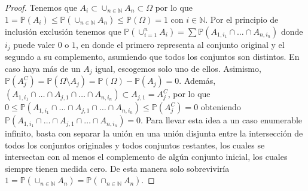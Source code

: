 \documentclass{article}
\theoremstyle{definition}
\theoremstyle{remark}
\newcommand{\BN}{\mathbb N}
\begin{document}
\begin{proof}
  Tenemos que $A_i \subset \cup_{n \in \BN} A_n \subset \Omega$ por lo que $1 = \mathbb{P}(A_i) \leq \mathbb{P}(\cup_{n \in \BN} A_n) \leq \mathbb{P}(\Omega) = 1$ con $i \in \BN$.
  Por el principio de inclusi\'on exclusi\'on tenemos que $\mathbb{P}(\cup_{i = 1}^n A_i) = \sum \mathbb{P}(A_{1, i_1} \cap \dots \cap A_{n, i_n})$
  donde $i_j$ puede valer $0$ o $1$, en donde el primero representa al conjunto original y el segundo a su complemento, asumiendo que todos los conjuntos son distintos.
  En caso haya m\'as de un $A_j$ igual, escogemos solo uno de ellos.
  Asimismo, $\mathbb{P}(A_j^C) = \mathbb{P}(\Omega \setminus A_j) = \mathbb{P}(\Omega) - \mathbb{P}(A_j) = 0$.
  Adem\'as, $(A_{1, i_1} \cap \dots \cap A_{j, 1} \cap \dots \cap A_{n, i_n}) \subset A_{j, 1} = A_j^C$, por lo que
  $0 \leq \mathbb{P}(A_{1, i_1} \cap \dots \cap A_{j, 1} \cap \dots \cap A_{n, i_n}) \leq \mathbb{P}(A_j^C) = 0$ obteniendo
  $\mathbb{P}(A_{1, i_1} \cap \dots \cap A_{j, 1} \cap \dots \cap A_{n, i_n}) = 0$.
  Para llevar esta idea a un caso enumerable infinito, basta con separar la uni\'on en una uni\'on disjunta entre la intersecci\'on de todos los conjuntos originales y todos conjuntos restantes, los cuales se intersectan con al menos el complemento de alg\'un conjunto inicial, los cuales siempre tienen medida cero.
  De esta manera solo sobrevivir\'ia $1 = \mathbb{P}(\cup_{n \in \BN} A_n) = \mathbb{P}(\cap_{n \in \BN} A_n)$.
\end{proof}
\end{document}
